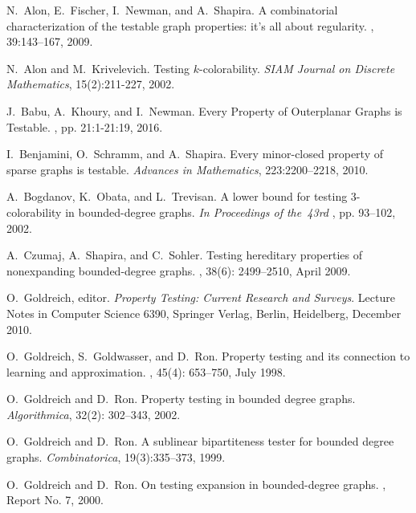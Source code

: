 \documentclass[11pt]{article}
\begin{document}
\renewcommand{\Proc}{{\rm In} Proceedings of the~}



\begin{thebibliography}{1}

N.~Alon, E.~Fischer, I.~Newman, and A.~Shapira.
\newblock A combinatorial characterization of the testable
  graph properties: it's all about regularity.
\newblock \emph{\SICOMP}, 39:143--167, 2009.

N.~Alon and M.~Krivelevich.
\newblock Testing $k$-colorability.
\newblock \emph{SIAM Journal on Discrete Mathematics}, 15(2):211-227, 2002.

J.~Babu, A.~Khoury, and I.~Newman.
\newblock Every Property of Outerplanar Graphs is Testable.
\newblock {\Proc APPROX-RANDOM}, pp. 21:1-21:19, 2016.

I.~Benjamini, O.~Schramm, and A.~Shapira.
\newblock Every minor-closed property of sparse graphs is
  testable.
\newblock \emph{Advances in Mathematics}, 223:2200--2218, 2010.

A.~Bogdanov, K.~Obata, and L.~Trevisan.
\newblock A lower bound for testing 3-colorability in
  bounded-degree graphs.
\newblock \emph{\Proc 43rd \FOCS}, pp. 93--102, 2002.

A.~Czumaj, A.~Shapira, and C.~Sohler.
\newblock Testing hereditary properties of nonexpanding
  bounded-degree graphs.
\newblock \emph{\SICOMP}, 38(6): 2499--2510, April 2009.

O.~Goldreich, editor.
\newblock \emph{Property Testing: Current Research and Surveys}.
\newblock Lecture Notes in Computer Science 6390, Springer Verlag,
  Berlin, Heidelberg, December 2010.

O.~Goldreich, S.~Goldwasser, and D.~Ron.
\newblock Property testing and its connection to learning
  and approximation.
\newblock \emph{\JACM}, 45(4): 653--750, July 1998.

O.~Goldreich and D.~Ron.
\newblock Property testing in bounded degree graphs.
\newblock \emph{Algorithmica}, 32(2): 302--343, 2002.

O.~Goldreich and D.~Ron.
\newblock A sublinear bipartiteness tester for bounded degree  graphs.
\newblock \emph{Combinatorica}, 19(3):335--373, 1999.

O.~Goldreich and D.~Ron.
\newblock On testing expansion in bounded-degree graphs.
\newblock \emph{\ECCC}, Report No. 7, 2000.


\end{thebibliography}
\end{document}
